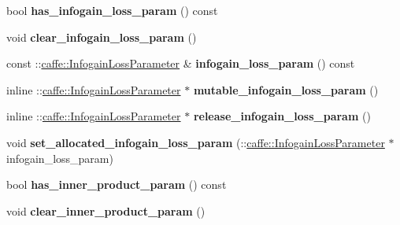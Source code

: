 \begin{DoxyCompactItemize}
\mbox{\label{classcaffe_1_1_layer_parameter_a90ec4b6413081ec6d3da9b27538ca4e6}} 
bool {\bfseries has\+\_\+infogain\+\_\+loss\+\_\+param} () const
\item 
\mbox{\label{classcaffe_1_1_layer_parameter_a6f4d3668e7d3a27f023b1db6bead2857}} 
void {\bfseries clear\+\_\+infogain\+\_\+loss\+\_\+param} ()
\item 
\mbox{\label{classcaffe_1_1_layer_parameter_ae871a4f4e6b4cda1fe12209d372582f3}} 
const \+::\mbox{\hyperlink{classcaffe_1_1_infogain_loss_parameter}{caffe\+::\+Infogain\+Loss\+Parameter}} \& {\bfseries infogain\+\_\+loss\+\_\+param} () const
\item 
\mbox{\label{classcaffe_1_1_layer_parameter_a80d8e75ab8c944e86e0af34f7ca88c8c}} 
inline \+::\mbox{\hyperlink{classcaffe_1_1_infogain_loss_parameter}{caffe\+::\+Infogain\+Loss\+Parameter}} $\ast$ {\bfseries mutable\+\_\+infogain\+\_\+loss\+\_\+param} ()
\item 
\mbox{\label{classcaffe_1_1_layer_parameter_a5e50a80cdbd5436a9663358176af4e42}} 
inline \+::\mbox{\hyperlink{classcaffe_1_1_infogain_loss_parameter}{caffe\+::\+Infogain\+Loss\+Parameter}} $\ast$ {\bfseries release\+\_\+infogain\+\_\+loss\+\_\+param} ()
\item 
\mbox{\label{classcaffe_1_1_layer_parameter_a3a41098c2f0a0ccbbc25874ec059e7b4}} 
void {\bfseries set\+\_\+allocated\+\_\+infogain\+\_\+loss\+\_\+param} (\+::\mbox{\hyperlink{classcaffe_1_1_infogain_loss_parameter}{caffe\+::\+Infogain\+Loss\+Parameter}} $\ast$infogain\+\_\+loss\+\_\+param)
\item 
\mbox{\label{classcaffe_1_1_layer_parameter_afd16ff3d538afeb69bc2cdf119037c54}} 
bool {\bfseries has\+\_\+inner\+\_\+product\+\_\+param} () const
\item 
\mbox{\label{classcaffe_1_1_layer_parameter_adda21b1fdcc34902c31a4d1d5b27be33}} 
void {\bfseries clear\+\_\+inner\+\_\+product\+\_\+param} ()
\item 

\end{DoxyCompactItemize}
